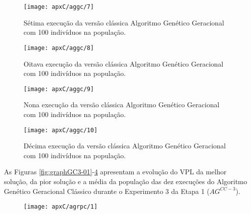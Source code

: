 \begin{figure}[H]
\centering
\texttt{[image: apxC/aggc/7]}
\caption{Sétima execução da versão clássica Algoritmo Genético Geracional com 100 indivíduos na população.}
\label{fig:graphGC3-07}
\end{figure}

\begin{figure}[H]
\centering
\texttt{[image: apxC/aggc/8]}
\caption{Oitava execução da versão clássica Algoritmo Genético Geracional com 100 indivíduos na população.}
\label{fig:graphGC3-08}
\end{figure}

\begin{figure}[H]
\centering
\texttt{[image: apxC/aggc/9]}
\caption{Nona execução da versão clássica Algoritmo Genético Geracional com 100 indivíduos na população.}
\label{fig:graphGC3-09}
\end{figure}

\begin{figure}[H]
\centering
\texttt{[image: apxC/aggc/10]}
\caption{Décima execução da versão clássica Algoritmo Genético Geracional com 100 indivíduos na população.}
\label{fig:graphGC3-10}
\end{figure}

As Figuras \ref{fig:graphGC3-01}-\ref{fig:graphGC3-10} apresentam a evolução do VPL da melhor solução, da pior solução e a média da população das dez execuções do Algoritmo Genético Geracional Clássico durante o Experimento 3 da Etapa 1 ($AG^{CC-3}$).

\begin{figure}[H]
\centering

\texttt{[image: apxC/agrpc/1]}

\end{figure}

